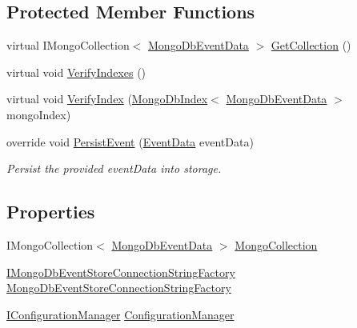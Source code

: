 \subsection*{Protected Member Functions}
\begin{DoxyCompactItemize}
\item 
virtual I\+Mongo\+Collection$<$ \hyperlink{classCqrs_1_1MongoDB_1_1Events_1_1MongoDbEventData}{Mongo\+Db\+Event\+Data} $>$ \hyperlink{classCqrs_1_1MongoDB_1_1Events_1_1MongoDbEventStore_aa6a9499aa1dcde55d82d8e0f3b5bd077_aa6a9499aa1dcde55d82d8e0f3b5bd077}{Get\+Collection} ()
\item 
virtual void \hyperlink{classCqrs_1_1MongoDB_1_1Events_1_1MongoDbEventStore_a60ae02928a3ae8cb99d46f6c340b5138_a60ae02928a3ae8cb99d46f6c340b5138}{Verify\+Indexes} ()
\item 
virtual void \hyperlink{classCqrs_1_1MongoDB_1_1Events_1_1MongoDbEventStore_a6a6f0303cd412974d90be87d281e81f5_a6a6f0303cd412974d90be87d281e81f5}{Verify\+Index} (\hyperlink{classCqrs_1_1MongoDB_1_1DataStores_1_1Indexes_1_1MongoDbIndex}{Mongo\+Db\+Index}$<$ \hyperlink{classCqrs_1_1MongoDB_1_1Events_1_1MongoDbEventData}{Mongo\+Db\+Event\+Data} $>$ mongo\+Index)
\item 
override void \hyperlink{classCqrs_1_1MongoDB_1_1Events_1_1MongoDbEventStore_a13f6823671d7cb9c042d8f7156a51b89_a13f6823671d7cb9c042d8f7156a51b89}{Persist\+Event} (\hyperlink{classCqrs_1_1Events_1_1EventData}{Event\+Data} event\+Data)
\begin{DoxyCompactList}\small\item\em Persist the provided {\itshape event\+Data}  into storage. \end{DoxyCompactList}\end{DoxyCompactItemize}
\subsection*{Properties}
\begin{DoxyCompactItemize}
\item 
I\+Mongo\+Collection$<$ \hyperlink{classCqrs_1_1MongoDB_1_1Events_1_1MongoDbEventData}{Mongo\+Db\+Event\+Data} $>$ \hyperlink{classCqrs_1_1MongoDB_1_1Events_1_1MongoDbEventStore_af2dfb3af9b76e8b1cab0f7dc68cdc377_af2dfb3af9b76e8b1cab0f7dc68cdc377}{Mongo\+Collection}
\item 
\hyperlink{interfaceCqrs_1_1MongoDB_1_1Events_1_1IMongoDbEventStoreConnectionStringFactory}{I\+Mongo\+Db\+Event\+Store\+Connection\+String\+Factory} \hyperlink{classCqrs_1_1MongoDB_1_1Events_1_1MongoDbEventStore_aa008df8aa5d4e63a2123735acb7cd775_aa008df8aa5d4e63a2123735acb7cd775}{Mongo\+Db\+Event\+Store\+Connection\+String\+Factory}
\item 
\hyperlink{interfaceCqrs_1_1Configuration_1_1IConfigurationManager}{I\+Configuration\+Manager} \hyperlink{classCqrs_1_1MongoDB_1_1Events_1_1MongoDbEventStore_a2944d6e589401531ba4283b984140c0e_a2944d6e589401531ba4283b984140c0e}{Configuration\+Manager}
\end{DoxyCompactItemize}

